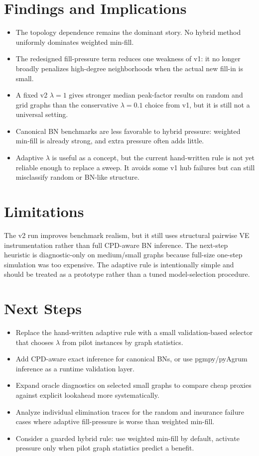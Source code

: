\documentclass[10pt]{article}
\begin{document}
\section*{Findings and Implications}
\begin{itemize}
\item The topology dependence remains the dominant story. No hybrid method uniformly dominates weighted min-fill.
\item The redesigned fill-pressure term reduces one weakness of v1: it no longer broadly penalizes high-degree neighborhoods when the actual new fill-in is small.
\item A fixed v2 $\lambda=1$ gives stronger median peak-factor results on random and grid graphs than the conservative $\lambda=0.1$ choice from v1, but it is still not a universal setting.
\item Canonical BN benchmarks are less favorable to hybrid pressure: weighted min-fill is already strong, and extra pressure often adds little.
\item Adaptive $\lambda$ is useful as a concept, but the current hand-written rule is not yet reliable enough to replace a sweep. It avoids some v1 hub failures but can still misclassify random or BN-like structure.
\end{itemize}

\section*{Limitations}
The v2 run improves benchmark realism, but it still uses structural pairwise VE instrumentation rather than full CPD-aware BN inference. The next-step heuristic is diagnostic-only on medium/small graphs because full-size one-step simulation was too expensive. The adaptive rule is intentionally simple and should be treated as a prototype rather than a tuned model-selection procedure.

\section*{Next Steps}
\begin{itemize}
\item Replace the hand-written adaptive rule with a small validation-based selector that chooses $\lambda$ from pilot instances by graph statistics.
\item Add CPD-aware exact inference for canonical BNs, or use pgmpy/pyAgrum inference as a runtime validation layer.
\item Expand oracle diagnostics on selected small graphs to compare cheap proxies against explicit lookahead more systematically.
\item Analyze individual elimination traces for the random and insurance failure cases where adaptive fill-pressure is worse than weighted min-fill.
\item Consider a guarded hybrid rule: use weighted min-fill by default, activate pressure only when pilot graph statistics predict a benefit.
\end{itemize}
\end{document}
